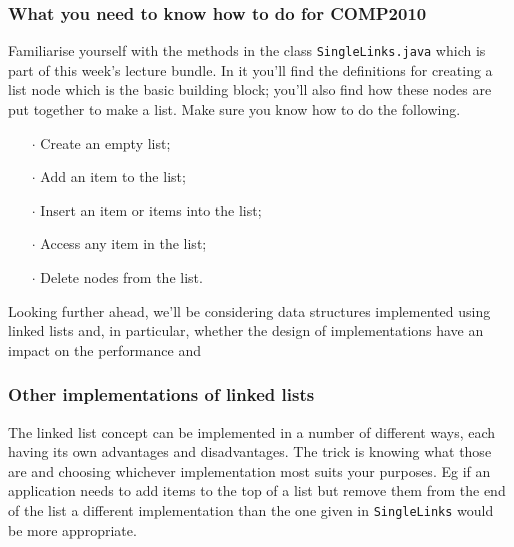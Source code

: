 \documentclass[twoside=false,DIV=14]{scrartcl}
\begin{document}
\subsubsection*{What you need to know how to do for COMP2010}
Familiarise yourself with the methods  in the class {\tt SingleLinks.java} which is part of this week's lecture bundle.  In it you'll find the definitions for  creating  a list node which is the basic building block; you'll also find how these nodes are put together to make a list.  Make sure you know how to do the following.
\begin{itemize}
\item[$\cdot$] Create an empty list;
\item[$\cdot$]  Add an item to the list;
\item[$\cdot$]  Insert an item or items into the list;
\item[$\cdot$]  Access any item in the list;
\item[$\cdot$]  Delete nodes from the list.
\end{itemize}

Looking further ahead, we'll be considering data structures implemented using linked lists and, in particular, whether the design of implementations have an impact on the performance and  


\subsubsection*{Other implementations of linked lists}
The linked list concept can be implemented in a number of different ways, each having its own advantages and disadvantages. The trick is knowing what those are and choosing whichever implementation most suits your purposes. Eg if an application needs to add items to the top of a list but remove them from the end of the list a different implementation than the one given in {\tt SingleLinks} would be more appropriate.
\end{document}
